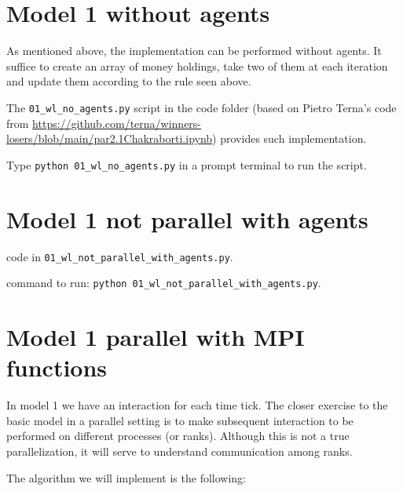 \documentclass{article}
\begin{document}
\section{Model 1 without agents}\label{sec:model1withoutagents}

As mentioned above, the implementation can be performed without agents.
It suffice to create an array of money holdings, take two of them at each iteration and update them according to the rule seen above.

The \verb+01_wl_no_agents.py+ script in the code folder (based on Pietro Terna's code from
\url{https://github.com/terna/winners-losers/blob/main/par2.1Chakraborti.ipynb}) provides such implementation.

Type \verb+python 01_wl_no_agents.py+ in a prompt terminal to run the script.


\section{Model 1 not parallel with agents}

code in \verb+01_wl_not_parallel_with_agents.py+.

\noindent command to run: \verb+python 01_wl_not_parallel_with_agents.py+.

\section{Model 1 parallel with MPI functions}



In model 1 we have an interaction for each time tick. The
closer exercise to the basic model in a parallel setting is to make subsequent interaction
to be performed on different processes (or ranks). Although this is not
a true parallelization, it will serve to understand communication among
ranks.

The algorithm we will implement is the following:
\end{document}
